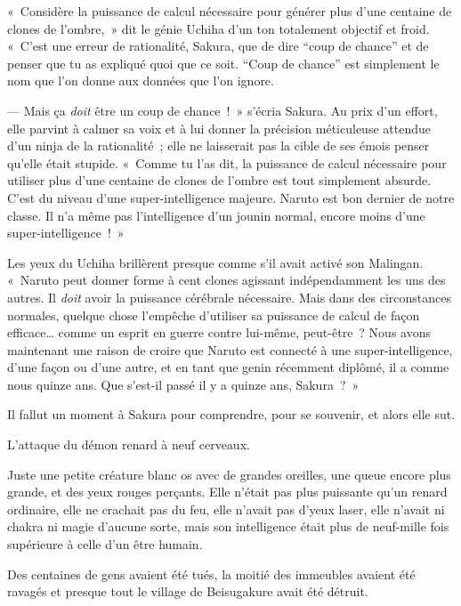 \pagebreak[2]

«~Considère la puissance de calcul nécessaire pour générer plus d'une centaine de clones de l'ombre,~» dit le génie Uchiha d'un ton totalement objectif et froid. «~C'est une erreur de rationalité, Sakura, que de dire “coup de chance” et de penser que tu as expliqué quoi que ce soit. “Coup de chance” est simplement le nom que l'on donne aux données que l'on ignore.

--- Mais ça \emph{doit} être un coup de chance~!~» s'écria Sakura. Au prix d'un effort, elle parvint à calmer sa voix et à lui donner la précision méticuleuse attendue d'un ninja de la rationalité~; elle ne laisserait pas la cible de ses émois penser qu'elle était stupide. «~Comme tu l'as dit, la puissance de calcul nécessaire pour utiliser plus d'une centaine de clones de l'ombre est tout simplement absurde. C'est du niveau d'une super-intelligence majeure. Naruto est bon dernier de notre classe. Il n'a même pas l'intelligence d'un jounin normal, encore moins d'une super-intelligence~!~»

Les yeux du Uchiha brillèrent presque comme s'il avait activé son Malingan. «~Naruto peut donner forme à cent clones agissant indépendamment les uns des autres. Il \emph{doit} avoir la puissance cérébrale nécessaire. Mais dans des circonstances normales, quelque chose l'empêche d'utiliser sa puissance de calcul de façon efficace… comme un esprit en guerre contre lui-même, peut-être~? Nous avons maintenant une raison de croire que Naruto est connecté à une super-intelligence, d'une façon ou d'une autre, et en tant que genin récemment diplômé, il a comme nous quinze ans. Que s'est-il passé il y a quinze ans, Sakura~?~»

Il fallut un moment à Sakura pour comprendre, pour se souvenir, et alors elle sut.

L'attaque du démon renard à neuf cerveaux.

Juste une petite créature blanc os avec de grandes oreilles, une queue encore plus grande, et des yeux rouges perçants. Elle n'était pas plus puissante qu'un renard ordinaire, elle ne crachait pas du feu, elle n'avait pas d'yeux laser, elle n'avait ni chakra ni magie d'aucune sorte, mais son intelligence était plus de neuf-mille fois supérieure à celle d'un être humain.

Des centaines de gens avaient été tués, la moitié des immeubles avaient été ravagés et presque tout le village de Beisugakure avait été détruit.

